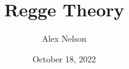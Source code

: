 \documentclass{report}
\title{Regge Theory}
\author{Alex Nelson}
\date{October 18, 2022}
\renewcommand\paragraphprefix{\thesection.}
\begin{document}
\maketitle

\renewcommand\paragraphprefix{\thesection.}
\tableofcontents


\appendix



\end{document}
